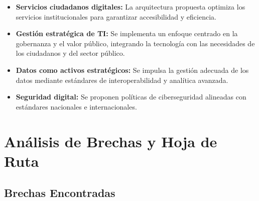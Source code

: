 \begin{itemize}
    \item \textbf{Servicios ciudadanos digitales:} La arquitectura propuesta optimiza los servicios institucionales para garantizar accesibilidad y eficiencia.

    \item \textbf{Gestión estratégica de TI:} Se implementa un enfoque centrado en la gobernanza y el valor público, integrando la tecnología con las necesidades de los ciudadanos y del sector público.

    \item \textbf{Datos como activos estratégicos:} Se impulsa la gestión adecuada de los datos mediante estándares de interoperabilidad y analítica avanzada.

    \item \textbf{Seguridad digital:} Se proponen políticas de ciberseguridad alineadas con estándares nacionales e internacionales.
\end{itemize}

\section{Análisis de Brechas y Hoja de Ruta}

\subsection{Brechas Encontradas}

